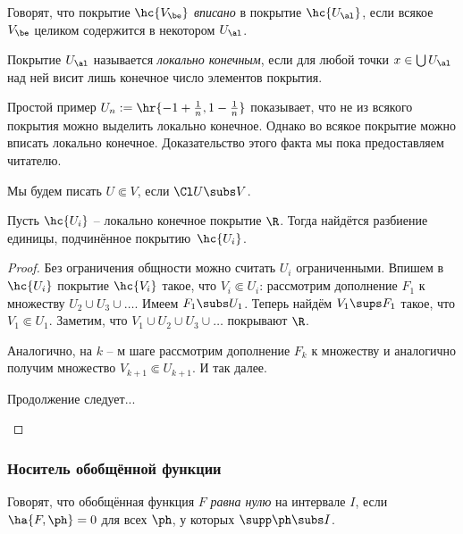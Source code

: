 \documentclass[a4paper]{article}
\begin{document}
\begin{df}
Говорят, что покрытие $\hc{V_\be}$ \emph{вписано} в покрытие $\hc{U_\al}$, если всякое $V_\be$ целиком
содержится в некотором $U_\al$.
\end{df}

\begin{df}
Покрытие $U_\al$ называется \emph{локально конечным}, если для любой точки $x \in \bigcup U_\al$ над ней
висит лишь конечное число элементов покрытия.
\end{df}

Простой пример $U_n := \hr{-1 + \frac1n,1 - \frac1n}$ показывает, что не из всякого покрытия
можно выделить локально конечное. Однако во всякое покрытие можно вписать локально конечное.
Доказательство этого факта мы пока предоставляем читателю.

Мы будем писать $U \Subset V$, если $\Cl U \subs V$.

\begin{stm}
Пусть $\hc{U_i}$ -- локально конечное покрытие $\R$. Тогда найдётся разбиение единицы,
подчинённое покрытию~$\hc{U_i}$.
\end{stm}
\begin{proof}
Без ограничения общности можно считать $U_i$ ограниченными.
Впишем в $\hc{U_i}$ покрытие $\hc{V_i}$ такое, что $V_i \Subset U_i$: рассмотрим дополнение $F_1$
к множеству $U_2\cup U_3\cup\dots$. Имеем $F_1 \subs U_1$. Теперь найдём $V_1 \sups F_1$ такое,
что $V_1 \Subset U_1$. Заметим, что $V_1 \cup U_2 \cup U_3 \cup\dots$ покрывают $\R$.

Аналогично, на $k$ -- м шаге рассмотрим дополнение $F_k$ к множеству
и аналогично получим множество $V_{k+1} \Subset U_{k+1}$. И так далее.

\begin{petit}
Продолжение следует...
\end{petit}
\end{proof}



\subsubsection{Носитель обобщённой функции}

\begin{df}
Говорят, что обобщённая функция $F$ \emph{равна нулю} на интервале $I$, если $\ha{F,\ph} = 0$ для всех $\ph$,
у которых $\supp \ph \subs I$.
\end{df}
\end{document}
